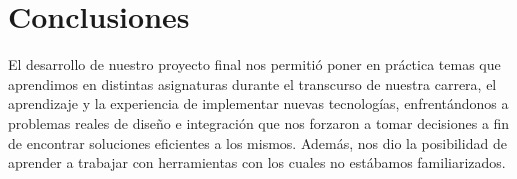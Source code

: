
\chapter{Conclusiones}

El desarrollo de nuestro proyecto final nos permitió poner en práctica temas que aprendimos en distintas asignaturas durante el transcurso de nuestra carrera, el aprendizaje y la experiencia de implementar nuevas tecnologías, enfrentándonos a problemas reales de diseño e integración que nos forzaron a tomar decisiones a fin de encontrar soluciones eficientes a los mismos. Además, nos dio la posibilidad de aprender a trabajar con herramientas con los cuales no estábamos familiarizados.


